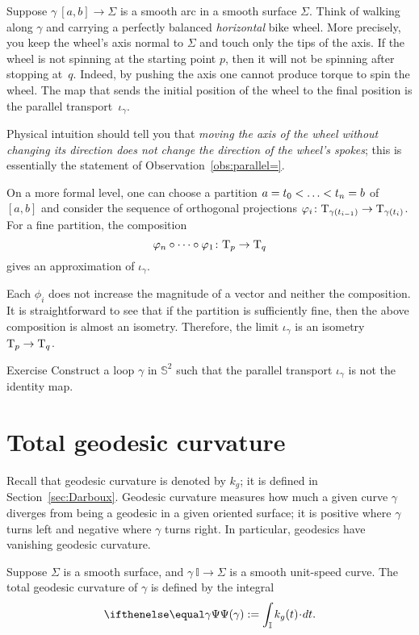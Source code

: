 Suppose $\gamma\:[a,b]\to\Sigma$ is a smooth arc in a smooth surface $\Sigma$.
Think of walking along $\gamma$ and carrying a perfectly balanced \textit{horizontal} bike wheel.
More precisely, you keep the wheel's axis normal to $\Sigma$ and touch only the tips of the axis.
If the wheel is not spinning at the starting point $p$, then it will not be spinning after stopping at~$q$.
Indeed, by pushing the axis one cannot produce torque to spin the wheel.
The map that sends the initial position of the wheel to the final position is the parallel transport~$\iota_\gamma$.

Physical intuition should tell you that \textit{moving the axis of the wheel without changing its direction does not change the direction of the wheel's spokes};
this is essentially the statement of Observation~\ref{obs:parallel=}.

On a more formal level, one can choose a partition $a=t_0<\dots\z<t_n=b$ of $[a,b]$
and consider the sequence of orthogonal projections $\varphi_i\colon\mathrm{T}_{\gamma(t_{i-1})}\to\mathrm{T}_{\gamma(t_i)}$.
For a fine partition, the composition 
\[\phi_n\circ\dots\circ\phi_1\:\T_p\z\to\T_q\]
gives an approximation of $\iota_\gamma$.

Each $\phi_i$ does not increase the magnitude of a vector and neither the composition.
It is straightforward to see that if the partition is sufficiently fine, then the above composition is almost an isometry.
Therefore, the limit $\iota_\gamma$ is an isometry $\T_p\z\to\T_q$.

\begin{thm}{Exercise}\label{ex:holonomy=not0}
Construct a loop $\gamma$ in $\mathbb{S}^2$ such that the parallel transport $\iota_\gamma$ is not the identity map.
\end{thm}

\section{Total geodesic curvature}

Recall that geodesic curvature is denoted by $k_g$;
it is defined in Section~\ref{sec:Darboux}.
Geodesic curvature measures how much a given curve $\gamma$ diverges from being a geodesic in a given oriented surface;
it is positive where $\gamma$ turns left and negative where $\gamma$ turns right.
In particular, geodesics have vanishing geodesic curvature.

Suppose $\Sigma$ is a smooth surface, and $\gamma\:\mathbb{I}\to \Sigma$ is a smooth unit-speed curve.
The total geodesic curvature of $\gamma$ is defined by the integral 
\[\tgc\gamma
\df
\int_{\mathbb{I}} k_g(t)\cdot dt.\]

